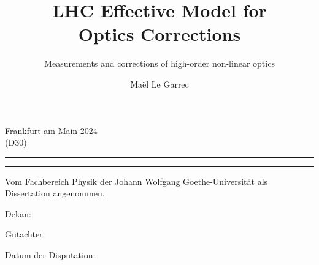 {{{        }
        \vspace{\vspacesecondtitlesecond}
        \vfill
        \begin{center}
            Frankfurt am Main 2024\\
            (D30)
        \end{center}

        \noindent\rule[0.5em]{\textwidth}{1.5pt}\vspace{-20pt}
        \noindent\rule[0.5em]{\textwidth}{1.5pt}
    }
    \makeatother
    
    \title{LHC Effective Model for\\Optics Corrections}
    \subtitle{Measurements and corrections of high-order non-linear optics}
    \author{Maël Le Garrec}

    \cleardoublepage
    \makesecondtitle
}


{
    \makeatletter
    \def\makethirdtitle{%
        \thispagestyle{empty} %
        \normalfont\subtitlefont\fontsize{11pt}{15pt}\selectfont%
        
        \begin{flushleft}
            Vom Fachbereich Physik der Johann Wolfgang Goethe-Universität als Dissertation angenommen.
        \end{flushleft}
        \vspace{\vspacesignatures}
        \vspace{\vspacesignatures}

        \noindent Dekan:

        \vspace{\vspacesignatures}
        \noindent Gutachter:

        \vspace{\vspacesignatures}
        \noindent Datum der Disputation:
    }
    \makeatother
    
    \clearpage
    \makethirdtitle
}
